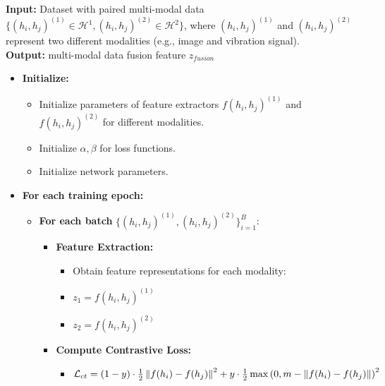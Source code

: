 \documentclass[preprint,12pt]{elsarticle}
\begin{document}
\begin{algorithm}[htbp]
  \caption{Multi-modal contrastive causal consistency fusion algorithm}
  \label{alg:m3cad}
  \small
  \textbf{Input:} Dataset with paired multi-modal data $\{({{h}_{i}}, {{h}_{j}})^{(1)} \in \mathcal{H}^{1}, ({h}_{i}, {{h}_{j}})^{(2)} \in \mathcal{H}^{2} \}$, where $({{h}_{i}}, {{h}_{j}})^{(1)}$ and $({{h}_{i}}, {{h}_{j}})^{(2)}$ represent two different modalities (e.g., image and vibration signal). \\
  \textbf{Output:} multi-modal data fusion feature $z_{fusion}$

  \begin{itemize}
    \item \textbf{Initialize:}
    \begin{itemize}
        \item Initialize parameters of feature extractors $f({{h}_{i}}, {{h}_{j}})^{(1)}$ and $f({{h}_{i}}, {{h}_{j}})^{(2)}$ for different modalities.
        \item Initialize $\alpha, \beta$ for loss functions.
        \item Initialize network parameters.
    \end{itemize}

    \item \textbf{For each training epoch:}
    \begin{itemize}
        \item \textbf{For each batch} $\{({{h}_{i}}, {{h}_{j}})^{(1)}, ({h}_{i}, {{h}_{j}})^{(2)}\}_{i=1}^{B}$:
        \begin{itemize}
            \item \textbf{Feature Extraction:}
            \begin{itemize}
                \item Obtain feature representations for each modality:
                \item $z_1 = f({{h}_{i}}, {{h}_{j}})^{(1)}$
                \item $z_2 = f({{h}_{i}}, {{h}_{j}})^{(2)}$
            \end{itemize}
            
            \item \textbf{Compute Contrastive Loss:}
            \begin{itemize}
                \item ${\mathcal{L}}_{ct} = (1 - y) \cdot \frac{1}{2} \left\| f({{h}_{i}}) - f({{h}_{j}}) \right\|^{2} + \\
 y \cdot \frac{1}{2} \max \left( 0, m - \left\| f({{h}_{i}}) - f({{h}_{j}}) \right\| \right)^{2}$
            \end{itemize}
            

\end{itemize}
\end{itemize}
\end{itemize}
\end{algorithm}
\end{document}
